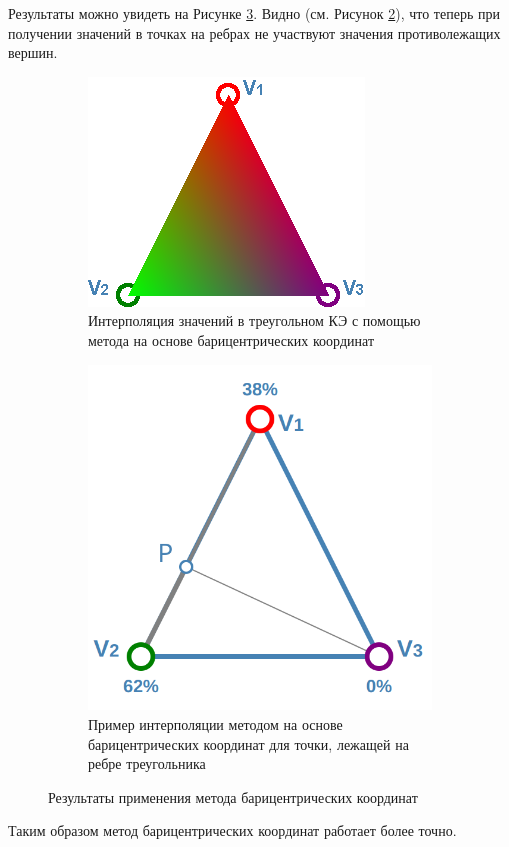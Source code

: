 Результаты можно увидеть на Рисунке \ref{bary_results}. Видно (см. Рисунок \ref{bary_example}), что теперь при получении значений в точках на ребрах не участвуют значения противолежащих вершин.
\begin{figure}[H]
	\hfill
	\begin{subfigure}{0.48\textwidth}
		\centering
		\includegraphics[width=\linewidth]{img/tri-int-bary}
		\caption{Интерполяция значений в треугольном КЭ с помощью метода на основе барицентрических координат}
		\label{tri-int-bary}
	\end{subfigure}
	\hfill
	\begin{subfigure}{0.45\textwidth}
		\centering
		\includegraphics[width=\linewidth]{img/bary_example}
		\caption{Пример интерполяции методом на основе барицентрических координат для точки, лежащей на ребре треугольника}
		\label{bary_example}
	\end{subfigure}
	\hfill
	\caption{Результаты применения метода барицентрических координат}
	\label{bary_results}
\end{figure}
Таким образом метод барицентрических координат работает более точно.

